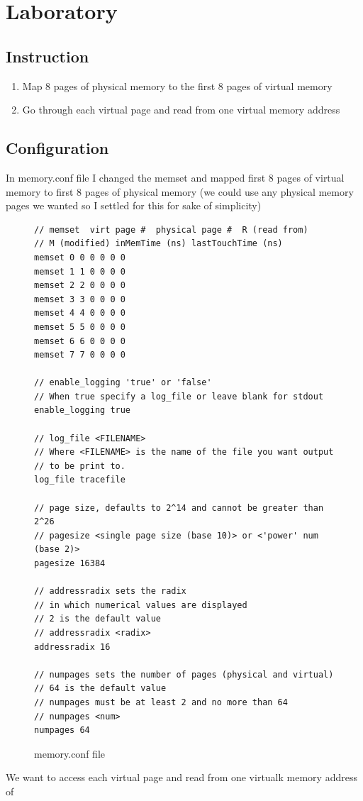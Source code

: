 \section{Laboratory}
\subsection{Instruction}
\begin{enumerate}
	\item Map 8 pages of physical memory to the first 8 pages of virtual
		memory
	\item Go through each virtual page and read from one virtual memory
		address 
\end{enumerate}
\subsection{Configuration}
In memory.conf file I changed the memset and mapped first 8 pages of virtual
memory to first 8 pages of physical memory (we could use any physical memory
pages we wanted so I settled for this for sake of simplicity)
\begin{figure}[H]
\caption{memory.conf file}
\begin{lstlisting}
// memset  virt page #  physical page #  R (read from)  
// M (modified) inMemTime (ns) lastTouchTime (ns)
memset 0 0 0 0 0 0
memset 1 1 0 0 0 0
memset 2 2 0 0 0 0
memset 3 3 0 0 0 0
memset 4 4 0 0 0 0
memset 5 5 0 0 0 0
memset 6 6 0 0 0 0
memset 7 7 0 0 0 0

// enable_logging 'true' or 'false'
// When true specify a log_file or leave blank for stdout
enable_logging true

// log_file <FILENAME>
// Where <FILENAME> is the name of the file you want output
// to be print to.
log_file tracefile

// page size, defaults to 2^14 and cannot be greater than 2^26
// pagesize <single page size (base 10)> or <'power' num (base 2)>
pagesize 16384

// addressradix sets the radix 
// in which numerical values are displayed
// 2 is the default value
// addressradix <radix>
addressradix 16

// numpages sets the number of pages (physical and virtual)
// 64 is the default value
// numpages must be at least 2 and no more than 64
// numpages <num>
numpages 64
\end{lstlisting}
\end{figure}
We want to access each virtual page and read from one virtualk memory address of
